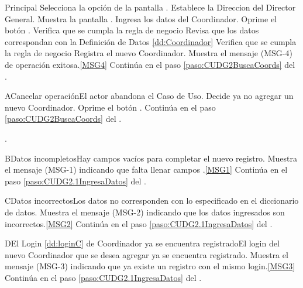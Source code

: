 	\begin{UCtrayectoria}{Principal}
			\UCpaso[\UCactor] Selecciona la opción  de la pantalla .
			\UCpaso Establece la Direccion del Director General.
			\UCpaso Muestra la pantalla .
			\UCpaso [\UCactor] Ingresa los datos del Coordinador. \label{paso:CUDG2.1IngresaDatos}
			\UCpaso [\UCactor] Oprime el botón .
			\UCpaso Verifica que se cumpla la regla de negocio  
			\UCpaso Revisa que los datos correspondan con la Definición de Datos \ref{dd:Coordinador} 
			\UCpaso Verifica que se cumpla la regla de negocio  
			\UCpaso Registra el nuevo Coordinador.
			\UCpaso Muestra el mensaje (MSG-4) de operación exitosa.\ref{MSG4}
			\UCpaso Continúa en el paso \ref{paso:CUDG2BuscaCoords} del .
	\end{UCtrayectoria}

	\begin{UCtrayectoriaA}{A}{Cancelar operación}{El actor abandona el Caso de Uso.}
			\UCpaso[\UCactor] Decide ya no agregar un nuevo Coordinador.
			\UCpaso[\UCactor] Oprime el botón .
			\UCpaso Continúa en el paso \ref{paso:CUDG2BuscaCoords} del .
	\end{UCtrayectoriaA}
		.
	\begin{UCtrayectoriaA}{B}{Datos incompletos}{Hay campos vacíos para completar el nuevo registro.}
			\UCpaso Muestra el mensaje (MSG-1) indicando que falta llenar campos .\ref{MSG1} 
			\UCpaso Continúa en el paso \ref{paso:CUDG2.1IngresaDatos} del .
	\end{UCtrayectoriaA}

	\begin{UCtrayectoriaA}{C}{Datos incorrectos}{Los datos no corresponden con lo especificado en el diccionario de datos.}
			\UCpaso Muestra el mensaje (MSG-2) indicando que los datos ingresados son incorrectos.\ref{MSG2}
			\UCpaso Continúa en el paso \ref{paso:CUDG2.1IngresaDatos} del .
	\end{UCtrayectoriaA}

	\begin{UCtrayectoriaA}{D}{El Login \ref{dd:loginC} de Coordinador ya se encuentra registrado}{El login del nuevo Coordinador que se desea agregar ya se encuentra registrado.}
			\UCpaso Muestra el mensaje (MSG-3) indicando que ya existe un registro con el mismo login.\ref{MSG3}
			\UCpaso Continúa en el paso \ref{paso:CUDG2.1IngresaDatos} del .
	\end{UCtrayectoriaA}

